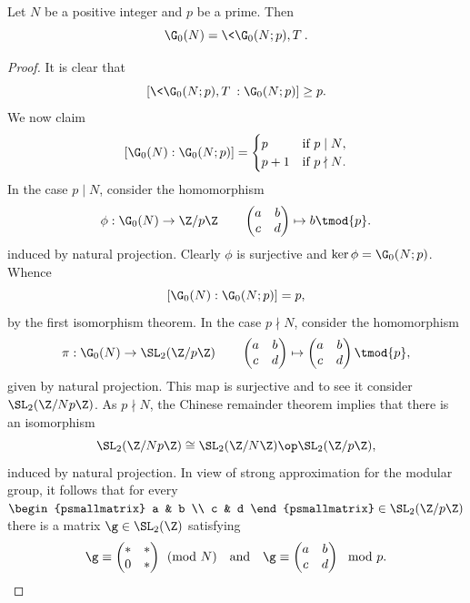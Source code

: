 \documentclass[12pt]{article}
\begin{document}
        \begin{proposition}\label{prop:prime_subgroup_generator_upper_triangular}
          Let \(N\) be a positive integer and \(p\) be a prime. Then
          \[
            \G_{0}(N) = \<\G_{0}(N;p),T\>.
          \]
        \end{proposition}
        \begin{proof}
          It is clear that
          \[
            [\<\G_{0}(N;p),T\>:\G_{0}(N;p)] \ge p.
          \]
          We now claim
          \[
            [\G_{0}(N):\G_{0}(N;p)] = \begin{cases} p & \text{if \(p \mid N\)}, \\ p+1 & \text{if \(p \nmid N\)}. \end{cases}
          \]
          In the case \(p \mid N\), consider the homomorphism
          \[
            \phi:\G_{0}(N) \to \Z/p\Z \qquad \begin{pmatrix} a & b \\ c & d \end{pmatrix} \mapsto b \tmod{p}.
          \]
          induced by natural projection. Clearly \(\phi\) is surjective and \(\ker\phi = \G_{0}(N;p)\). Whence
          \[
            [\G_{0}(N):\G_{0}(N;p)] = p,
          \]
          by the first isomorphism theorem. In the case \(p \nmid N\), consider the homomorphism
          \[
            \pi:\G_{0}(N) \to \SL_{2}(\Z/p\Z) \qquad \begin{pmatrix} a & b \\ c & d \end{pmatrix} \mapsto \begin{pmatrix} a & b \\ c & d \end{pmatrix} \tmod{p},
          \]
          given by natural projection. This map is surjective and to see it consider \(\SL_{2}(\Z/Np\Z)\). As \(p \nmid N\), the Chinese remainder theorem implies that there is an isomorphism
          \[
            \SL_{2}(\Z/Np\Z) \cong \SL_{2}(\Z/N\Z) \op \SL_{2}(\Z/p\Z),
          \]
          induced by natural projection. In view of strong approximation for the modular group, it follows that for every \(\begin{psmallmatrix} a & b \\ c & d \end{psmallmatrix} \in \SL_{2}(\Z/p\Z)\) there is a matrix \(\g \in \SL_{2}(\Z)\) satisfying
          \[
            \g \equiv \begin{pmatrix} \ast & \ast \\ 0 & \ast \end{pmatrix} \pmod{N} \quad \text{and} \quad \g \equiv \begin{pmatrix} a & b \\ c & d \end{pmatrix} \mod{p}.
\]
\end{proof}
\end{document}
